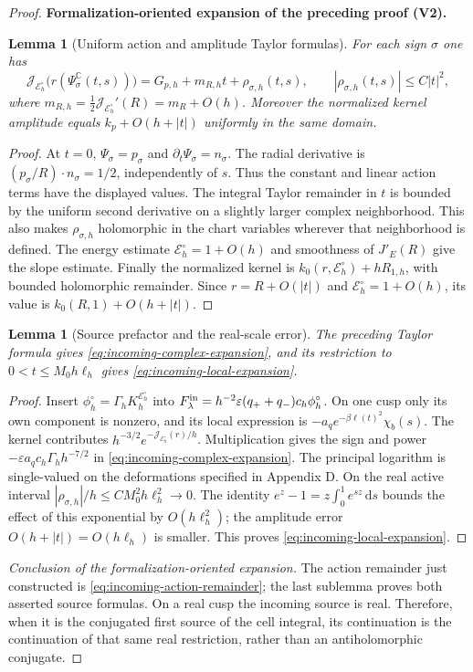 \documentclass[11pt]{article}
\newtheorem{lemma}[theorem]{Lemma}
\newcommand{\formalisationparentid}{X}
\newenvironment{formalisationaddition}[1]{\par\medskip\begingroup\color{blue}\def\formalisationparentid{#1}\setcounter{formalizationsublemma}{0}\let\lemma\formalizationsublemma\let\endlemma\endformalizationsublemma
  \def\Eo{\mathcal E_h^\circ}\def\EE{\mathcal E_h}\def\phio{\phi_h^\circ}\def\phih{\phi_h}\def\Ho{H_h^{\rm atom}(v^\circ)}\def\Ha{H_h^{\rm atom}}\def\HL{H_h^{L}}\def\Dh{D_h}\def\Log{\operatorname{Log}}\def\ellh{\ell_h}\def\Gp{G_{p,h}}\def\Ast{A_{*,h}}\def\ahat{\widehat{\mathfrak a}_h}\def\ah{\mathfrak a_h}\def\rh{\widehat\rho_h}\def\deltah{\widehat\delta_h}\def\oldref##1{\textup{(##1)}}\def\interface##1{\par\noindent\textit{Analytical interface used here.} ##1\par}\def\finish{\par\noindent\textit{Conclusion of the formalization-oriented expansion.} }\par\noindent\textbf{Formalization-oriented expansion of the preceding proof (V2).}\par\smallskip
}{\par\endgroup\medskip
}
\newcommand{\C}{\mathbb C}
\newcommand{\eps}{\varepsilon}
\newcommand{\cJ}{\mathcal J}
\begin{document}
\begin{proof}
\begin{formalisationaddition}{L6.3}
\begin{lemma}[Uniform action and amplitude Taylor formulas]\label{sublemma:L6-3-taylor}
For each sign $\sigma$ one has
\[
 \cJ_{\Eo}\bigl(r(\Psi_\sigma^{\C}(t,s))\bigr)
 =\Gp+m_{R,h}t+\rho_{\sigma,h}(t,s),\qquad
 |\rho_{\sigma,h}(t,s)|\le C|t|^2,
\]
where $m_{R,h}=\tfrac12\cJ_{\Eo}'(R)=m_R+O(h)$. Moreover the normalized kernel amplitude equals $k_p+O(h+|t|)$ uniformly in the same domain.
\end{lemma}
\begin{proof}
At $t=0$, $\Psi_\sigma=p_\sigma$ and $\partial_t\Psi_\sigma=n_\sigma$. The radial derivative is $(p_\sigma/R)\cdot n_\sigma=1/2$, independently of $s$. Thus the constant and linear action terms have the displayed values. The integral Taylor remainder in $t$ is bounded by the uniform second derivative on a slightly larger complex neighborhood. This also makes $\rho_{\sigma,h}$ holomorphic in the chart variables wherever that neighborhood is defined. The energy estimate $\Eo=1+O(h)$ and smoothness of $J'_E(R)$ give the slope estimate. Finally the normalized kernel is $k_0(r,\Eo)+hR_{1,h}$, with bounded holomorphic remainder. Since $r=R+O(|t|)$ and $\Eo=1+O(h)$, its value is $k_0(R,1)+O(h+|t|)$.
\end{proof}

\begin{lemma}[Source prefactor and the real-scale error]\label{sublemma:L6-3-source}
The preceding Taylor formula gives \eqref{eq:incoming-complex-expansion}, and its restriction to $0<t\le M_0h\ellh$ gives \eqref{eq:incoming-local-expansion}.
\end{lemma}
\begin{proof}
Insert $\phio=\Gamma_hK_h^{\Eo}$ into $F_\lambda^{\rm in}=h^{-2}\eps(q_++q_-)c_h\phio$. On one cusp only its own component is nonzero, and its local expression is $-a_qe^{-\beta\ell(t)^2}\chi_b(s)$. The kernel contributes $h^{-3/2}e^{-\cJ_{\Eo}(r)/h}$. Multiplication gives the sign and power $-\eps a_qc_h\Gamma_hh^{-7/2}$ in \eqref{eq:incoming-complex-expansion}. The principal logarithm is single-valued on the deformations specified in Appendix D. On the real active interval $|\rho_{\sigma,h}|/h\le CM_0^2h\ellh^2\to0$. The identity $e^z-1=z\int_0^1e^{sz}\,\mathrm ds$ bounds the effect of this exponential by $O(h\ellh^2)$; the amplitude error $O(h+|t|)=O(h\ellh)$ is smaller. This proves \eqref{eq:incoming-local-expansion}.
\end{proof}
\finish The action remainder just constructed is \eqref{eq:incoming-action-remainder}; the last sublemma proves both asserted source formulas. On a real cusp the incoming source is real. Therefore, when it is the conjugated first source of the cell integral, its continuation is the continuation of that same real restriction, rather than an antiholomorphic conjugate.
\end{formalisationaddition}

\end{proof}
\end{document}
